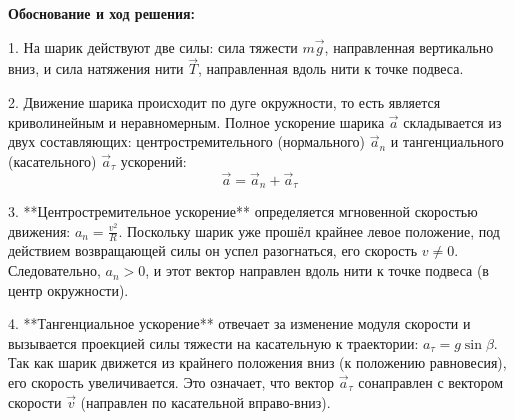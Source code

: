 \begin{taskmedium}
\begin{center}
\end{center}

\begin{solutionbox}
\textbf{Обоснование и ход решения:}

1. На шарик действуют две силы: сила тяжести $m\vec{g}$, направленная вертикально вниз, и сила натяжения нити $\vec{T}$, направленная вдоль нити к точке подвеса.

2. Движение шарика происходит по дуге окружности, то есть является криволинейным и неравномерным. Полное ускорение шарика $\vec{a}$ складывается из двух составляющих: центростремительного (нормального) $\vec{a}_n$ и тангенциального (касательного) $\vec{a}_\tau$ ускорений:
$$\vec{a} = \vec{a}_n + \vec{a}_\tau$$

3. **Центростремительное ускорение** определяется мгновенной скоростью движения: $a_n = \frac{v^2}{R}$. Поскольку шарик уже прошёл крайнее левое положение, под действием возвращающей силы он успел разогнаться, его скорость $v \neq 0$. Следовательно, $a_n > 0$, и этот вектор направлен вдоль нити к точке подвеса (в центр окружности).

4. **Тангенциальное ускорение** отвечает за изменение модуля скорости и вызывается проекцией силы тяжести на касательную к траектории: $a_\tau = g \sin\beta$. Так как шарик движется из крайнего положения вниз (к положению равновесия), его скорость увеличивается. Это означает, что вектор $\vec{a}_\tau$ сонаправлен с вектором скорости $\vec{v}$ (направлен по касательной вправо-вниз).


\end{solutionbox}
\end{taskmedium}
